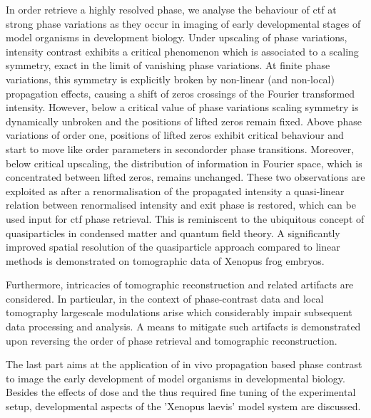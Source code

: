 \documentclass[
twoside,
openright,
titlepage,
numbers=noenddot,
headinclude,
fleqn,
a4paper,
footinclude=true,
cleardoublepage=empty,
abstractoff,
BCOR=5mm,
paper=a4,
fontsize=11pt,
british,ngerman,american,
]{scrreprt}
\begin{document}
In order retrieve a highly resolved phase, we analyse the behaviour of
\ac{ctf} at strong phase variations as they occur in imaging of early
developmental stages of model organisms in development biology.  Under
upscaling of phase variations, intensity contrast exhibits a critical
phenomenon which is associated to a scaling symmetry, exact in the
limit of vanishing phase variations.  At finite phase variations, this
symmetry is explicitly broken by non-linear (and non-local)
propagation effects, causing a shift of  zeros crossings of the
Fourier transformed intensity.  However, below a critical value of
phase variations scaling symmetry is dynamically unbroken and the
positions of lifted zeros remain fixed.  Above phase variations of
order one, positions of lifted zeros exhibit critical behaviour and
start to move like order parameters in second\hyph order phase
transitions.  Moreover, below critical upscaling, the distribution of
information in Fourier space, which is concentrated between lifted
zeros, remains unchanged.  These two observations are exploited as
after a renormalisation of the propagated intensity a quasi-linear
relation between renormalised intensity and exit phase is restored,
which can be used input for \ac{ctf} phase retrieval.  This is
reminiscent to the ubiquitous concept of quasiparticles in condensed
matter and quantum field theory.  A significantly improved spatial
resolution of the quasiparticle approach compared to linear methods is
demonstrated on tomographic data of Xenopus frog embryos.

Furthermore, intricacies of tomographic reconstruction and related
artifacts are considered.  In particular, in the context of
phase-contrast data and local tomography large\hyph scale modulations
arise which considerably impair subsequent data processing and
analysis.  A means to mitigate such artifacts is demonstrated upon
reversing the order of phase retrieval and tomographic reconstruction.

The last part aims at the application of in vivo propagation\hyph
based phase contrast to image the early development of model organisms
in developmental biology.  Besides the effects of dose and the thus
required fine tuning of the experimental setup, developmental aspects
of the 'Xenopus laevis' model system are discussed.
 
\endgroup			
\vfill
\cleardoublepage

\begingroup
\let\clearpage\relax
\let\cleardoublepage\relax
\let\cleardoublepage\relax
\end{document}
